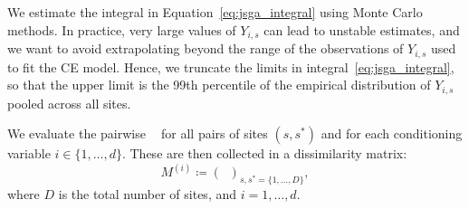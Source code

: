 \documentclass[12pt,compact]{article}
\newcommand{\eJSGa}[1]{\mathop{\mathrm{eJS}_{i, #1}^{\mathrm{G}_{\lambda}}}\nolimits}
\newcommand\numberthis{\addtocounter{equation}{1}\tag{\theequation}}
\begin{document}
We estimate the integral in Equation~\eqref{eq:jsga_integral} using Monte Carlo methods. %
In practice, very large values of $Y_{i, s}$ can lead to unstable estimates, and we want to avoid extrapolating beyond the range of the observations of $Y_{i, s}$ used to fit the CE model. 
Hence, we truncate the limits in integral~\eqref{eq:jsga_integral}, so that the upper limit is the 99th percentile of the empirical distribution of $Y_{i, s}$ pooled across all sites. %

We evaluate the pairwise $\eJSGa{s, s^*}$ for all pairs of sites $(s, s^*)$ and for each conditioning variable $i \in \{1, \ldots, d\}$. 
These are then collected in a dissimilarity matrix:
\begin{equation} \label{eq:distance_matrix}
  M^{(i)} \coloneq \left(\eJSGa{s, s^*} \right)_{s, s^* = \{1, \ldots, D\}},
\end{equation}
where $D$ is the total number of sites, and $i = 1, \ldots, d$.
\end{document}
